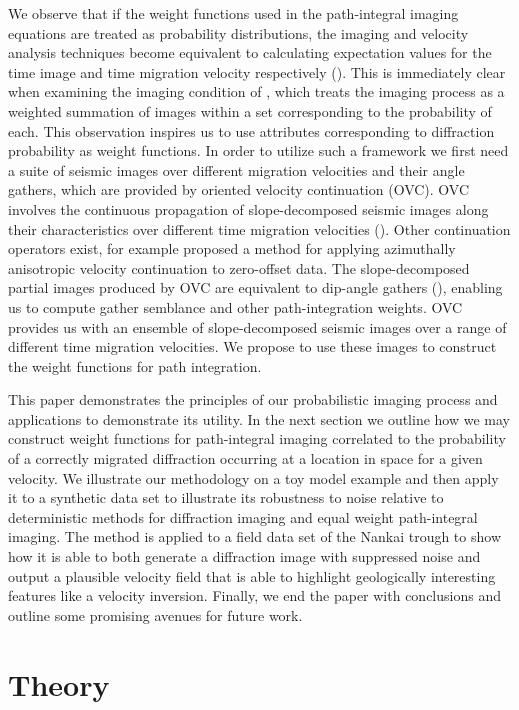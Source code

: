 We observe that if the weight functions used in the path-integral imaging equations are treated as probability distributions, the imaging and velocity analysis techniques become equivalent to calculating expectation values for the time image and time migration velocity respectively (\citealp{fomel2014}).  This is immediately clear when examining the imaging condition of \cite{landa2006}, which treats the imaging process as a weighted summation of images within a set corresponding to the probability of each.
This observation inspires us to use attributes corresponding to diffraction probability as weight functions.  
In order to utilize such a framework we first need a suite of seismic images over different migration velocities and their angle gathers, which are provided by oriented velocity continuation (OVC). 
OVC involves the continuous propagation of slope-decomposed seismic images along their characteristics over different time migration velocities (\citealp{decker2014b,deckerovc}). Other continuation operators exist, for example \cite{burnett-2011} proposed a method for applying azimuthally anisotropic velocity continuation to zero-offset data.  The slope-decomposed partial images produced by OVC are equivalent to dip-angle gathers (\citealp{decker2014a}), enabling us to compute gather semblance and other path-integration weights.
OVC provides us with an ensemble of slope-decomposed seismic images over a range of different time migration velocities. We propose to use these images to construct the weight functions for path integration.

This paper demonstrates the principles of our probabilistic imaging process and applications to demonstrate its utility. In the next section we outline how we may construct weight functions for path-integral imaging correlated to the probability of a correctly migrated diffraction occurring at a location in space for a given velocity.  We illustrate our methodology on a toy model example and then apply it to a synthetic data set to illustrate its robustness to noise relative to deterministic methods for diffraction imaging and equal weight path-integral imaging.  The method is applied to a field data set of the Nankai trough to show how it is able to both generate a diffraction image with suppressed noise and output a plausible velocity field that is able to highlight geologically interesting features like a velocity inversion.  Finally, we  end the paper with conclusions and outline some promising avenues for future work.

\section{Theory}

